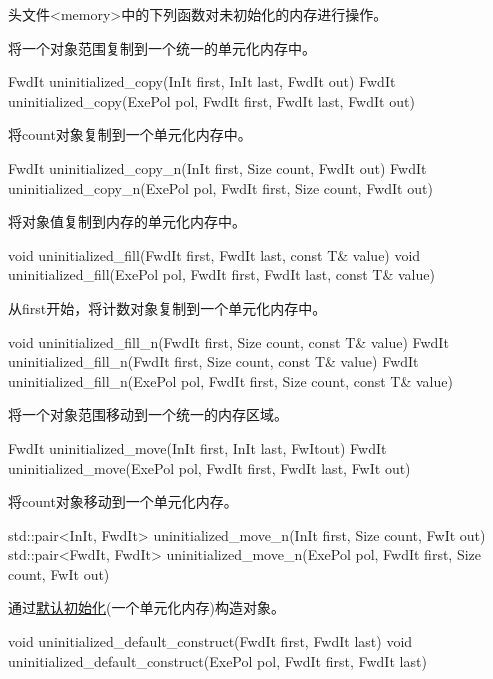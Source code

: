 头文件<memory>中的下列函数对未初始化的内存进行操作。

将一个对象范围复制到一个统一的单元化内存中。

\begin{cpp}
FwdIt uninitialized_copy(InIt first, InIt last, FwdIt out)
FwdIt uninitialized_copy(ExePol pol, FwdIt first, FwdIt last, FwdIt out)
\end{cpp}

将count对象复制到一个单元化内存中。

\begin{cpp}
FwdIt uninitialized_copy_n(InIt first, Size count, FwdIt out)
FwdIt uninitialized_copy_n(ExePol pol, FwdIt first, Size count, FwdIt out)
\end{cpp}

将对象值复制到内存的单元化内存中。

\begin{cpp}
void uninitialized_fill(FwdIt first, FwdIt last, const T& value)
void uninitialized_fill(ExePol pol, FwdIt first, FwdIt last, const T& value)
\end{cpp}

从first开始，将计数对象复制到一个单元化内存中。

\begin{cpp}
void uninitialized_fill_n(FwdIt first, Size count, const T& value)
FwdIt uninitialized_fill_n(FwdIt first, Size count, const T& value)
FwdIt uninitialized_fill_n(ExePol pol, FwdIt first, Size count, const T& value)
\end{cpp}

将一个对象范围移动到一个统一的内存区域。

\begin{cpp}
FwdIt uninitialized_move(InIt first, InIt last, FwItout)
FwdIt uninitialized_move(ExePol pol, FwdIt first, FwdIt last, FwIt out)
\end{cpp}

将count对象移动到一个单元化内存。

\begin{cpp}
std::pair<InIt, FwdIt> uninitialized_move_n(InIt first, Size count, FwIt out)
std::pair<FwdIt, FwdIt> uninitialized_move_n(ExePol pol, FwdIt first, Size count,
											 FwIt out)
\end{cpp}

通过\href{https://en.cppreference.com/w/cpp/language/default_initialization}{默认初始化}(一个单元化内存)构造对象。

\begin{cpp}
void uninitialized_default_construct(FwdIt first, FwdIt last)
void uninitialized_default_construct(ExePol pol, FwdIt first, FwdIt last)
\end{cpp}

